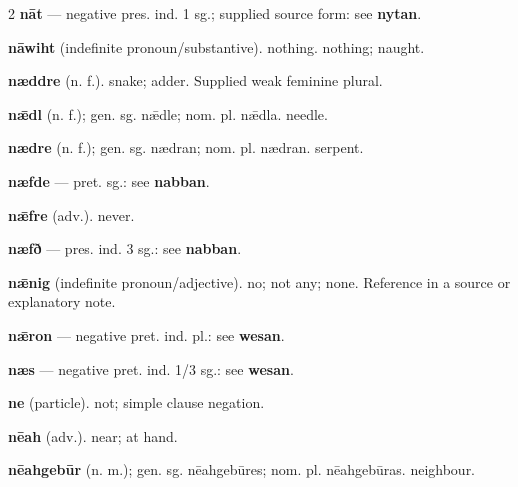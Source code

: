 \begin{multicols*}{2}
\textbf{nāt} — negative pres. ind. 1 sg.; supplied source form: see \textbf{nytan}.\par
\textbf{nāwiht} (indefinite pronoun/substantive). nothing. nothing; naught.\par
\textbf{næddre} (n. f.). snake; adder. Supplied weak feminine plural.\par
\textbf{nǣdl} (n. f.); gen. sg. nǣdle; nom. pl. nǣdla. needle.\par
\textbf{nædre} (n. f.); gen. sg. nædran; nom. pl. nædran. serpent.\par
\textbf{næfde} — pret. sg.: see \textbf{nabban}.\par
\textbf{nǣfre} (adv.). never.\par
\textbf{næfð} — pres. ind. 3 sg.: see \textbf{nabban}.\par
\textbf{nǣnig} (indefinite pronoun/adjective). no; not any; none. Reference in a source or explanatory note.\par
\textbf{nǣron} — negative pret. ind. pl.: see \textbf{wesan}.\par
\textbf{næs} — negative pret. ind. 1/3 sg.: see \textbf{wesan}.\par
\textbf{ne} (particle). not; simple clause negation.\par
\textbf{nēah} (adv.). near; at hand.\par
\textbf{nēahgebūr} (n. m.); gen. sg. nēahgebūres; nom. pl. nēahgebūras. neighbour.\par

\end{multicols*}
